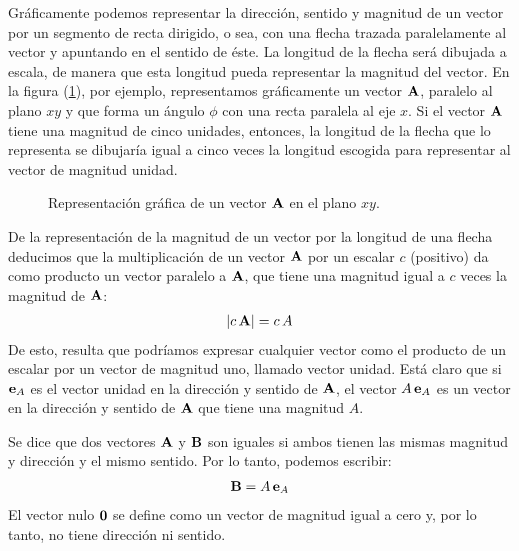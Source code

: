 Gráficamente podemos representar la dirección, sentido y magnitud de un vector por un segmento de recta dirigido, o sea, con una flecha trazada paralelamente al vector y apuntando en el sentido de éste. La longitud de la flecha será dibujada a escala, de manera que esta longitud pueda representar la magnitud del vector. En la figura (\ref{fig:figura_01_01}), por ejemplo, representamos gráficamente un vector $\vb{A}$, paralelo al plano $x y$ y que forma un ángulo $\phi$ con una recta paralela al eje $x$. Si el vector $\vb{A}$ tiene una magnitud de cinco unidades, entonces, la longitud de la flecha que lo representa se dibujaría igual a cinco veces la longitud escogida para representar al vector de magnitud unidad. 
\begin{figure}[H]
    \centering
    \caption{Representación gráfica de un vector $\vb{A}$ en el plano $x y$.}
    \label{fig:figura_01_01}
\end{figure}
De la representación de la magnitud de un vector por la longitud de una flecha deducimos que la multiplicación de un vector $\vb{A}$ por un escalar $c$ (positivo) da como producto un vector paralelo a $\vb{A}$, que tiene una magnitud igual a $c$ veces la magnitud de $\vb{A}$:
\begin{align}
    \abs{c \, \vb{A}} = c \, A
    \label{eq:ecuacion_01_01}
\end{align} 
De esto, resulta que podríamos expresar cualquier vector como el producto de un escalar por un vector de magnitud uno, llamado vector unidad. Está claro que si $\vb{e}_{A}$ es el vector unidad en la dirección y sentido de $\vb{A}$, el vector $A \, \vb{e}_{A}$ es un vector en la dirección y sentido de $\vb{A}$ que tiene una magnitud $A$. 
\par
Se dice que dos vectores $\vb{A}$ y $\vb{B}$ son iguales si ambos tienen las mismas magnitud y dirección y el mismo sentido. Por lo tanto, podemos escribir:
\begin{align}
    \vb{B} = A \, \vb{e}_{A}
    \label{eq:ecuacion_01_02} 
\end{align}
El vector nulo $\vb{0}$ se define como un vector de magnitud igual a cero y, por lo tanto, no tiene dirección ni sentido.

